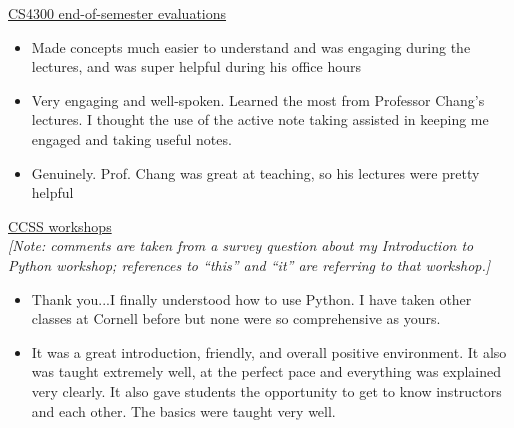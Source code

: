 \documentclass[12pt,letterpaper]{article}
\begin{document}
\noindent\underline{CS4300 end-of-semester evaluations}
\begin{itemize}
    \item Made concepts much easier to understand and was engaging during the lectures, and was super helpful during his office hours
    \item Very engaging and well-spoken. Learned the most from Professor Chang's lectures. I thought the use of the active note taking assisted in keeping me engaged and taking useful notes.
    \item Genuinely. Prof. Chang was great at teaching, so his lectures were pretty helpful
\end{itemize}

\noindent\underline{CCSS workshops}\\
\emph{[Note: comments are taken from a survey question about my Introduction to Python workshop; references to ``this'' and ``it'' are referring to that workshop.]}
\begin{itemize}
    \item Thank you...I finally understood how to use Python. I have taken other classes at Cornell before but none were so comprehensive as yours.
    \item It was a great introduction, friendly, and overall positive environment. It also was taught extremely well, at the perfect pace and everything was explained very clearly. It also gave students the opportunity to get to know instructors and each other. The basics were taught very well.
\end{itemize}

\else
%
\fi
\end{document}
